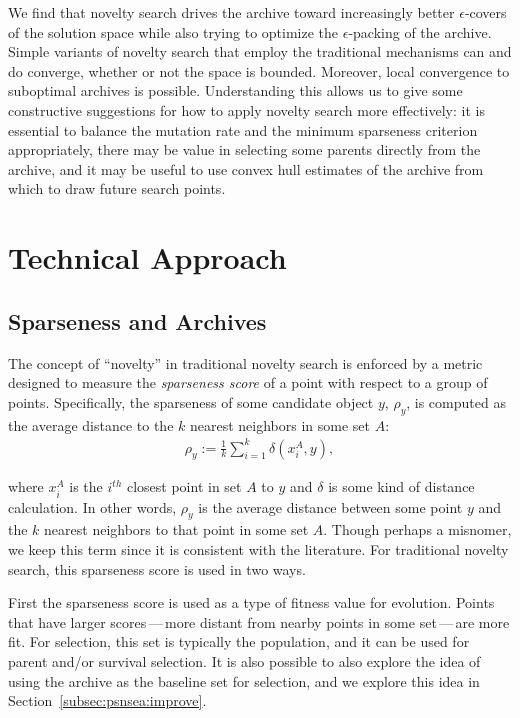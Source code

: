 \documentclass[twoside]{article}
\begin{document}
We find that novelty search drives the archive toward increasingly better $\epsilon$-covers of the solution space while also trying to optimize the $\epsilon$-packing of the archive.  Simple variants of novelty search that employ the traditional mechanisms can and do converge, whether or not the space is bounded.  Moreover, local convergence to suboptimal archives is possible.  Understanding this allows us to give some constructive suggestions for how to apply novelty search more effectively: it is essential to balance the mutation rate and the minimum sparseness criterion appropriately, there may be value in selecting some parents directly from the archive, and it may be useful to use convex hull estimates of the archive from which to draw future search points.



\section{Technical Approach}
\label{sec:approach}

\subsection{Sparseness and Archives}
\label{subsec:sparseness}

The concept of ``novelty'' in traditional novelty search is enforced by a metric designed to measure the \emph{sparseness score} of a point with respect to a group of points.  Specifically, the sparseness of some candidate object $y$, $\rho_y$, is computed as the average distance to the $k$ nearest neighbors in some set $A$:
%
\begin{eqnarray}
  \rho_y := \frac{1}{k} \sum_{i=1}^{k} \delta\left( x^A_i, y\right),
  \label{eqn:sparseness}
\end{eqnarray}

\noindent where $x^A_i$ is the $i^{th}$ closest point in set $A$ to $y$ and $\delta$ is some kind of distance calculation.  In other words, $\rho_y$ is the average distance between some point $y$ and the $k$ nearest neighbors to that point in some set $A$.  Though perhaps a misnomer, we keep this term since it is consistent with the literature.  For traditional novelty search, this sparseness score is used in two ways.  

First the sparseness score is used as a type of fitness value for evolution.  Points that have larger scores\,---\,more distant from nearby points in some set\,---\,are more fit.  For selection, this set is typically the population, and it can be used for parent and/or survival selection.  It is also possible to also explore the idea of using the archive as the baseline set for selection, and we explore this idea in Section~\ref{subsec:psnsea:improve}.
\end{document}
